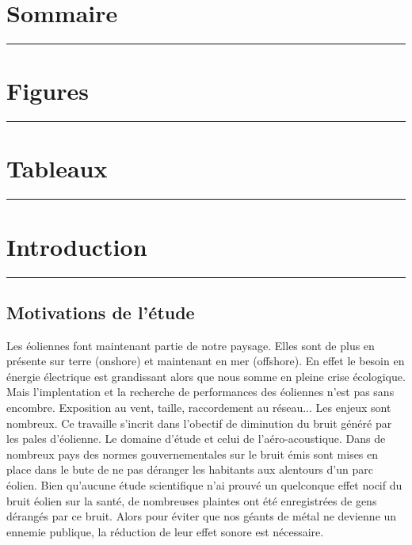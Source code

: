 \documentclass[12pt]{article}
\theoremstyle{plain}
\theoremstyle{remark}
\begin{document}
	\newpage
	
	\section*{Sommaire}
	
	\noindent\rule{\textwidth}{0.3pt}
	\vspace{0.5cm}
	

\clearpage
\section*{\Large Figures}
\noindent\rule{\textwidth}{0.3pt}
\vspace{0.5cm}

\listoffigures

\clearpage
\section*{\Large Tableaux}
\noindent\rule{\textwidth}{0.3pt}
\vspace{0.5cm}

\listoftables
	
\clearpage
	
	
	\section{Introduction}
	\noindent\rule{\linewidth}{2pt}
	\vspace{0.1cm}
	\subsection{Motivations de l'étude}
	
	Les éoliennes font maintenant partie de notre paysage. Elles sont de plus en présente sur terre (onshore) et maintenant en mer (offshore). En effet le besoin en énergie électrique est grandissant alors que nous somme en pleine crise écologique. Mais l'implentation et la recherche de performances des éoliennes n'est pas sans encombre. Exposition au vent, taille, raccordement au réseau... Les enjeux sont nombreux. Ce travaille s'incrit dans l'obectif de diminution du bruit généré par les pales d'éolienne. Le domaine d'étude et celui de l'aéro-acoustique. Dans de nombreux pays des normes gouvernementales sur le bruit émis \cite{impactacoustique2023} sont mises en place dans le bute de ne pas déranger les habitants aux alentours d'un parc éolien. Bien qu'aucune étude scientifique n'ai prouvé un quelconque effet nocif du bruit éolien sur la santé, de nombreuses plaintes ont été enregistrées de gens dérangés par ce bruit. Alors pour éviter que nos géants de métal ne devienne un ennemie publique, la réduction de leur effet sonore est nécessaire. \\
	
\end{document}
